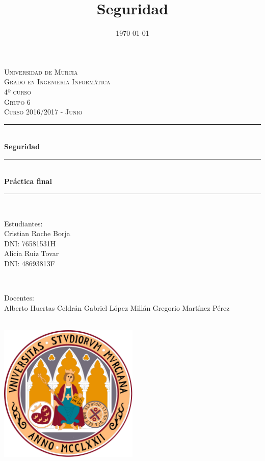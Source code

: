 \documentclass[a4,12pt,onecolum]{article}
\title{Seguridad}
\date{\today}
\begin{document}

\begin{titlepage}

\newcommand{\HRule}{\rule{\linewidth}{0.5mm}} %

\center %

\textsc{\LARGE Universidad de Murcia}\\[0.8cm]
\textsc{\Large Grado en Ingeniería Informática}\\[0.5cm]
\textsc{\large 4º curso}\\[0.4cm]
\textsc{\large Grupo 6}\\[0.4cm]
\textsc{\large Curso 2016/2017 - Junio}\\[0.4cm]

\HRule \\[0.6cm]
{ \huge \bfseries Seguridad}\\[0.3cm]
\HRule \\[0.5cm]
{ \Large \bfseries Práctica final}\\[0.3cm]
\HRule \\[1.0cm]


\begin{minipage}{0.4\textwidth}
\begin{flushleft} \large
Estudiantes:\\
Cristian Roche Borja \\
\small{DNI: 76581531H}	\\
\large{Alicia Ruiz Tovar} \\
\small{DNI: 48693813F}
\end{flushleft}
\end{minipage}
~
\begin{minipage}{0.4\textwidth}
\begin{flushright} \large
Docentes: \\
Alberto Huertas Celdrán
Gabriel López Millán
Gregorio Martínez Pérez
\end{flushright}
\end{minipage}\\[1cm]


\centering
\includegraphics[width=0.5\textwidth]{./portada/logoum.png}\\[0.8cm] %

\end{titlepage}
\end{document}
